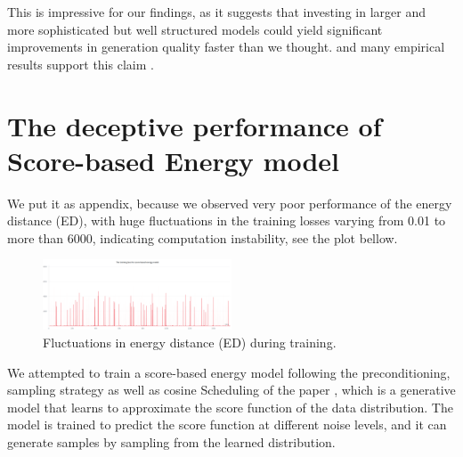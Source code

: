 \documentclass[twocolumn,superscriptaddress,aps]{revtex4-1}
\begin{document}
This is impressive for our findings, as it suggests that investing in larger and more sophisticated but well structured models could yield significant improvements in generation quality faster than we thought. and many empirical results support this claim \cite{arora2019finegrained}.




\newpage



\clearpage
\appendix
\section{The deceptive performance of Score-based Energy model}
We put it as appendix, because we observed very poor performance of the energy distance (ED), with huge fluctuations in the training losses varying from 0.01 to more than 6000, indicating computation instability, see the plot bellow.
\begin{figure}[H]
\centering
\includegraphics[width=0.5\textwidth]{figures/score-based-loss.png}
\caption{Fluctuations in energy distance (ED) during training.}
\label{fig:energy_distance_fluctuations}
\end{figure}

We attempted to train a score-based energy model following the preconditioning, sampling strategy as well as cosine Scheduling of the paper \cite{karras2022elucidating}, which is a generative model that learns to approximate the score function of the data distribution. The model is trained to predict the score function at different noise levels, and it can generate samples by sampling from the learned distribution.
\end{document}
